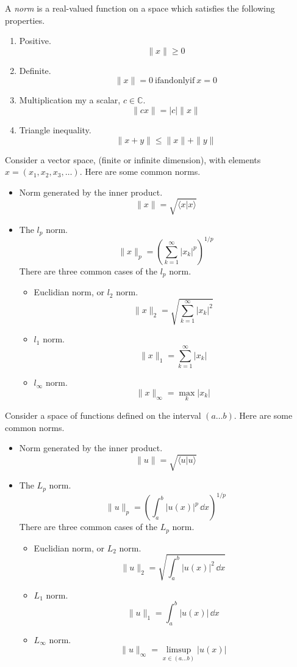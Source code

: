 A \textit{norm} is a real-valued function on a space which satisfies the
following properties.
\begin{enumerate}
\item
  Positive.
  \[
  \|x\| \geq 0
  \]
\item
  Definite.
  \[
  \|x\| = 0\ \mathrm{if and only if}\ x = 0
  \]
\item
  Multiplication my a scalar, $c \in \mathbb{C}$.
  \[
  \| c x \| = |c| \|x \|
  \]
\item
  Triangle inequality.
  \[
  \|x + y\| \leq \|x\| + \|y\|
  \]
\end{enumerate}




\begin{Example}
  Consider a vector space, (finite or infinite dimension), with elements
  $x = (x_1, x_2, x_3, \ldots)$.  Here are some common norms.
  \begin{itemize}
  \item
    Norm generated by the inner product.
    \[
    \|x\| = \sqrt{\langle x | x \rangle}
    \]
  \item
    The $l_p$ norm.
    \[
    \|x\|_p = \left( \sum_{k = 1}^\infty |x_k|^p \right)^{1/p}
    \]
    There are three common cases of the $l_p$ norm.
    \begin{itemize}
    \item
      Euclidian norm, or $l_2$ norm.
      \[
      \|x\|_2 = \sqrt{ \sum_{k = 1}^\infty |x_k|^2 }
      \]
    \item
      $l_1$ norm.
      \[
      \|x\|_1 = \sum_{k = 1}^\infty |x_k|
      \]
    \item
      $l_\infty$ norm.
      \[
      \|x\|_\infty = \max_k |x_k|
      \]
    \end{itemize}
  \end{itemize}
\end{Example}






\begin{Example}
  Consider a space of functions defined on the interval $(a \ldots b)$.
  Here are some common norms.
  \begin{itemize}
  \item
    Norm generated by the inner product.
    \[
    \|u\| = \sqrt{\langle u | u \rangle}
    \]
  \item
    The $L_p$ norm.
    \[
    \|u\|_p = \left( \int_a^b |u(x)|^p \,\dd x \right)^{1/p}
    \]
    There are three common cases of the $L_p$ norm.
    \begin{itemize}
    \item
      Euclidian norm, or $L_2$ norm.
      \[
      \|u\|_2 = \sqrt{ \int_a^b |u(x)|^2 \,\dd x }
      \]
    \item
      $L_1$ norm.
      \[
      \|u\|_1 = \int_a^b |u(x)| \,\dd x
      \]
    \item
      $L_\infty$ norm.
      \[
      \|u\|_\infty = \limsup_{x \in (a \ldots b)} |u(x)|
      \]
    \end{itemize}
  \end{itemize}
\end{Example}




